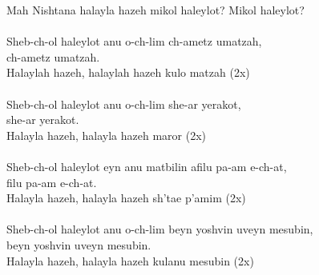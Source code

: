 \documentclass[twoside,14pt,openany,letterpaper]{memoir}%
\begin{document}

Mah Nishtana halayla hazeh mikol haleylot? Mikol haleylot?\\
\\
Sheb-ch-ol haleylot anu o-ch-lim ch-ametz umatzah,\\
ch-ametz umatzah.\\
Halaylah hazeh, halaylah hazeh kulo matzah (2x)\\
\\
Sheb-ch-ol haleylot anu o-ch-lim she-ar yerakot,\\
she-ar yerakot.\\
Halayla hazeh, halayla hazeh maror (2x)\\
\\
Sheb-ch-ol haleylot eyn anu matbilin afilu pa-am e-ch-at,\\
filu pa-am e-ch-at.\\
Halayla hazeh, halayla hazeh sh’tae p’amim (2x)\\
\\
Sheb-ch-ol haleylot anu o-ch-lim beyn yoshvin uveyn mesubin,\\
beyn yoshvin uveyn mesubin.\\
Halayla hazeh, halayla hazeh kulanu mesubin (2x)\\


\end{document}
